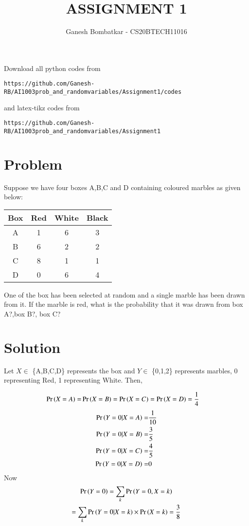 \documentclass[journal,12pt,twocolumn]{IEEEtran}
\begin{document}
     \def\rightbox#1{\makebox[0in][r]{#1}}
     \def\centbox#1{\makebox[0in]{#1}}
     \def\topbox#1{\raisebox{-\baselineskip}[0in][0in]{#1}}
     \def\midbox#1{\raisebox{-0.5\baselineskip}[0in][0in]{#1}}
\vspace{3cm}
\title{ASSIGNMENT 1}
\author{Ganesh Bombatkar - CS20BTECH11016}
\maketitle
\newpage
\bigskip
\renewcommand{\thefigure}{\theenumi}
\renewcommand{\thetable}{\theenumi}
Download all python codes from 
\begin{lstlisting}
https://github.com/Ganesh-RB/AI1003prob_and_randomvariables/Assignment1/codes
\end{lstlisting}
%
and latex-tikz codes from 
%
\begin{lstlisting}
https://github.com/Ganesh-RB/AI1003prob_and_randomvariables/Assignment1
\end{lstlisting}
\section{Problem}
Suppose we have four boxes A,B,C and D containing coloured marbles as given below:
\begin{center}
\begin{tabular}{||c c c c||}
    \hline
    Box &Red &White &Black \\
    \hline
    A &1 &6 &3\\
    \hline
    B &6 &2 &2\\
    \hline
    C &8 &1 &1\\
    \hline
    D &0 &6 &4\\
    \hline
\end{tabular}
\end{center}
One of the box has been selected at random and a single marble has been drawn from it. If the marble is red, what is the probability that it was drawn from box A?,box B?, box C?

\section{Solution}
Let $X\in$ \{A,B,C,D\} represents the box and $Y \in$ \{0,1,2\} represents marbles, 0 representing Red, 1 representing White. Then,

\begin{align}
    \Pr\left(X=A\right)=& \Pr\left(X=B\right)= \Pr\left(X=C\right)=\Pr\left(X=D\right)= \frac{1}{4}
\end{align}
\begin{align}
    \Pr\left(Y=0|X=A\right)=&\frac{1}{10}
    \\  \Pr\left(Y=0|X=B\right)=&\frac{3}{5}
    \\  \Pr\left(Y=0|X=C\right)=&\frac{4}{5}
    \\  \Pr\left(Y=0|X=D\right)=& 0
\end{align}
Now
\begin{multline}
    \Pr\left(Y=0\right)= \sum_{k}{\Pr\left(Y=0,X=k\right)}
    \\ =\sum_{k}{\Pr\left(Y=0|X=k\right) \times \Pr\left(X=k\right)}
    = \frac{3}{8}
\end{multline}
\end{document}
